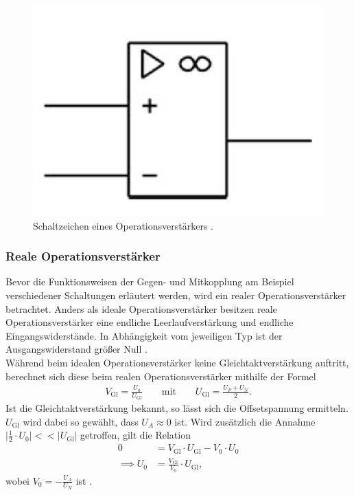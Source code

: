 \begin{figure}
  \centering
  \includegraphics[scale=0.5]{ressources/figure_02.png}
  \caption{Schaltzeichen eines Operationsverstärkers \cite{federau}.}
  \label{fig:02}
\end{figure}
\subsubsection{Reale Operationsverstärker}
\noindent Bevor die Funktionsweisen der Gegen- und Mitkopplung am Beispiel
verschiedener Schaltungen erläutert werden, wird ein realer Operationsverstärker
betrachtet. Anders als ideale Operationsverstärker besitzen reale
Operationsverstärker eine endliche Leerlaufverstärkung und endliche
Eingangswiderstände. In Abhängigkeit vom jeweiligen Typ ist der Ausgangswiderstand
größer Null \cite{federau}.\\
\noindent Während beim idealen Operationsverstärker keine Gleichtaktverstärkung
auftritt, berechnet sich diese beim realen Operationsverstärker mithilfe der
Formel
\begin{align}
  V_\text{Gl} = \frac{U_a}{U_\text{Gl}} \qquad \text{mit} \qquad U_\text{Gl} = \frac{U_P + U_N}{2}.
  \label{eqn:03}
\end{align}
\noindent Ist die Gleichtaktverstärkung bekannt, so lässt sich die Offsetspannung
ermitteln. $U_\text{Gl}$ wird dabei so gewählt, dass $U_A \approx 0$ ist. Wird
zusätzlich die Annahme $\bigr| \frac{1}{2} \cdot U_0 \bigr| << \bigr| U_\text{Gl} \bigr|$
getroffen, gilt die Relation
\begin{align}
  0 &= V_\text{Gl} \cdot U_\text{Gl} - V_0 \cdot U_0 \\
  \implies U_0 &= \frac{V_\text{Gl}}{V_0} \cdot U_\text{Gl},
  \label{eqn:04}
\end{align}
\noindent wobei $V_0 = - \frac{U_A}{U_N}$ ist \cite{muenster}.
